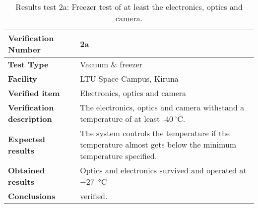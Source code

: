 \begin{table}[H]
\centering

\begin{tabular}{|m{}| m{} |}
\hline
\textbf{Verification Number} 		& 2a 							 \\ \hline
\textbf{Test Type} 					& Vacuum \& freezer				 \\ \hline
\textbf{Facility} 					& LTU Space Campus, Kiruna 			 \\ \hline
\textbf{Verified item} 				& Electronics, optics and camera \\ \hline

\textbf{Verification description} 	& The electronics, optics and camera withstand a temperature of at least -40\,$^\circ$C. \\ \hline

\textbf{Expected results} 			& The system controls the temperature if the temperature almost gets below the minimum temperature specified.\\ \hline

\textbf{Obtained results} 			& Optics and electronics survived and operated at \SI{-27}{\degreeCelsius} \\ \hline

\textbf{Conclusions} 				& verified.		\\ \hline
\end{tabular}
\caption{Results test 2a: Freezer test of at least the electronics, optics and camera.}
\label{tab:testresult2:thermal}
\end{table}


\raggedbottom